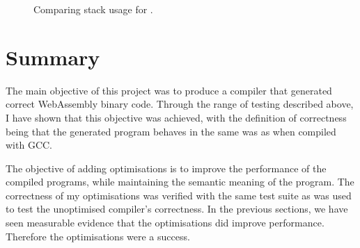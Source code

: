 \documentclass[00-main.tex]{subfiles}
\begin{document}
\begin{figure}[ht]
  \centering
  \caption{Comparing stack usage for .}
  \label{fig:comparing stack usage for fibonacci.c}
\end{figure}



\section{Summary}

The main objective of this project was to produce a compiler that generated correct WebAssembly binary code.
Through the range of testing described above, I have shown that this objective was achieved, with the definition of correctness being that the generated program behaves in the same was as when compiled with GCC.

The objective of adding optimisations is to improve the performance of the compiled programs, while maintaining the semantic meaning of the program.
The correctness of my optimisations was verified with the same test suite as was used to test the unoptimised compiler's correctness.
In the previous sections, we have seen measurable evidence that the optimisations did improve performance.
Therefore the optimisations were a success.
\end{document}
